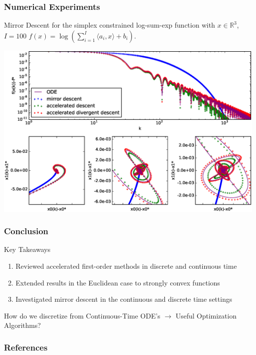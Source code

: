 \documentclass{beamer}
\begin{document}
\begin{frame}
\frametitle{Numerical Experiments}
Mirror Descent for the simplex constrained log-sum-exp function with $x\in\mathbb{R}^3$, $I=100$ $f(x) = \log \left( \sum_{i=1}^I \langle a_i,x\rangle + b_i \right)$.
\begin{center}
\includegraphics[width=0.87\linewidth]{Experiments/amd-all.eps}
\end{center}
\end{frame}

\begin{frame}
\frametitle{Conclusion}

\begin{block}{Key Takeaways}
\begin{enumerate}
    \item Reviewed accelerated first-order methods in discrete and continuous time
    \item Extended results in the Euclidean case to strongly convex functions
    \item Investigated mirror descent in the continuous and discrete time settings
\end{enumerate}
\end{block}

\huge{
How do we discretize from Continuous-Time ODE's $\to$ Useful Optimization Algorithms?
}

\end{frame}

\begin{frame}[t, allowframebreaks]
\frametitle{References}
\footnotesize{


\cite{*}}
\end{frame}
\end{document}
